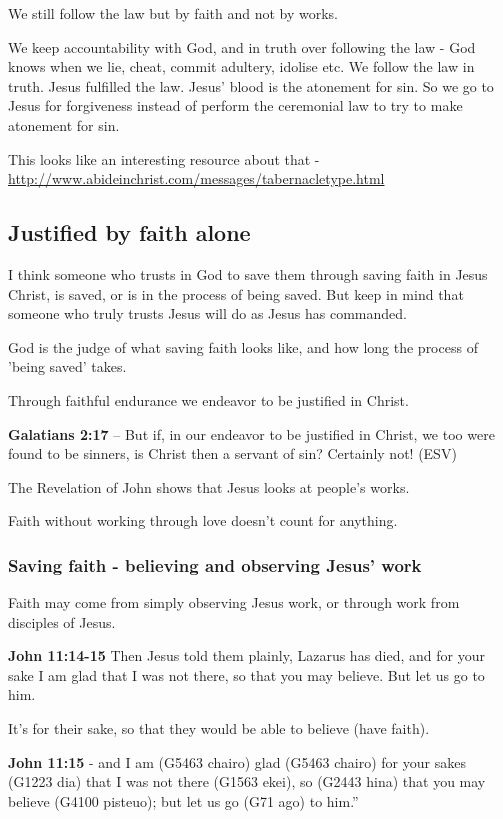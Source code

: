 \documentclass[11pt]{article}
\begin{document}
We still follow the law but by faith and not by works.

We keep accountability with God, and in truth over following the law - God knows when we lie, cheat, commit adultery, idolise etc.
We follow the law in truth.
Jesus fulfilled the law. Jesus' blood is the atonement for sin.
So we go to Jesus for forgiveness instead of perform the ceremonial law to try to make atonement for sin.

This looks like an interesting resource about that - \url{http://www.abideinchrist.com/messages/tabernacletype.html}

\subsection{Justified by faith alone}
\label{sec:org9afe009}
I think someone who trusts in God to save them through saving faith in Jesus Christ, is saved, or is in the process of being saved.
But keep in mind that someone who truly trusts Jesus will do as Jesus has commanded.

God is the judge of what saving faith looks like, and how long the process of 'being saved' takes.

Through faithful endurance we endeavor to be justified in Christ.

\textbf{Galatians 2:17} -- But if, in our endeavor to be justified in Christ, we too were found to be sinners, is Christ then a servant of sin? Certainly not! (ESV)

The Revelation of John shows that Jesus looks at people's works.

Faith without working through love doesn't count for anything.

\subsubsection{Saving faith - believing and observing Jesus' work}
\label{sec:org5ac17c2}
Faith may come from simply observing Jesus work, or through work from
disciples of Jesus.

\textbf{John 11:14-15} Then Jesus told them plainly, Lazarus has died, and for your sake I am glad that I was not there, so that you may believe. But let us go to him.

It's for their sake, so that they would be able to believe (have faith).

\textbf{John 11:15} - and I am (G5463 chairo) glad (G5463 chairo) for your sakes (G1223 dia) that I was not there (G1563 ekei), so (G2443 hina) that you may believe (G4100 pisteuo); but let us go (G71 ago) to him.”
\end{document}
